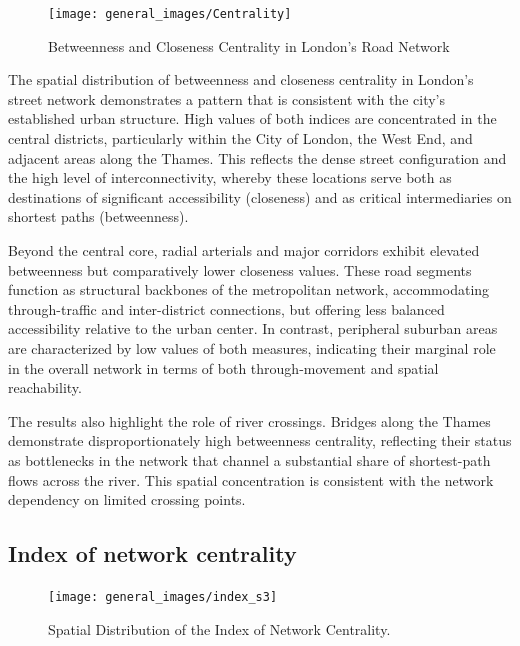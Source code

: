 \documentclass[
  12pt,
  oneside]{book}
\begin{document}
\begin{figure}

{\centering \texttt{[image: general\_images/Centrality]} 

}

\caption{Betweenness and Closeness Centrality in London's Road Network}\label{fig:Centrality}
\end{figure}

The spatial distribution of betweenness and closeness centrality in London's street network demonstrates a pattern that is consistent with the city's established urban structure. High values of both indices are concentrated in the central districts, particularly within the City of London, the West End, and adjacent areas along the Thames. This reflects the dense street configuration and the high level of interconnectivity, whereby these locations serve both as destinations of significant accessibility (closeness) and as critical intermediaries on shortest paths (betweenness).

Beyond the central core, radial arterials and major corridors exhibit elevated betweenness but comparatively lower closeness values. These road segments function as structural backbones of the metropolitan network, accommodating through-traffic and inter-district connections, but offering less balanced accessibility relative to the urban center. In contrast, peripheral suburban areas are characterized by low values of both measures, indicating their marginal role in the overall network in terms of both through-movement and spatial reachability.

The results also highlight the role of river crossings. Bridges along the Thames demonstrate disproportionately high betweenness centrality, reflecting their status as bottlenecks in the network that channel a substantial share of shortest-path flows across the river. This spatial concentration is consistent with the network dependency on limited crossing points.

\subsection{Index of network centrality}\label{index-of-network-centrality}

\begin{figure}

{\centering \texttt{[image: general\_images/index\_s3]} 

}

\caption{Spatial Distribution of the Index of Network Centrality.}\label{fig:indexs3}
\end{figure}
\end{document}
